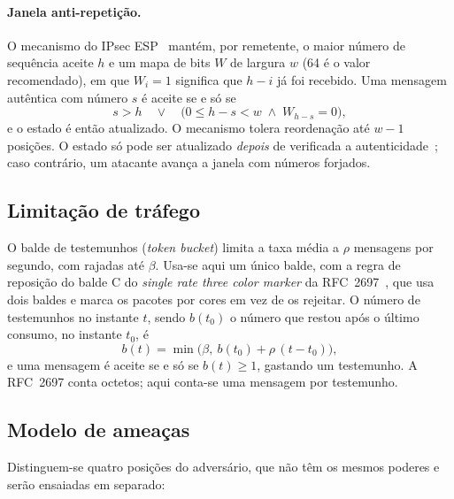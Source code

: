 \paragraph{Janela anti-repetição.} O mecanismo do IPsec ESP~\cite[§3.4.3]{rfc4303} mantém,
por remetente, o maior número de sequência aceite $h$ e um mapa de bits $W$ de
largura $w$ (64 é o valor recomendado), em que $W_i = 1$ significa que $h - i$ já
foi recebido. Uma mensagem autêntica com número $s$ é aceite se e só se
\begin{equation}
  s > h \quad\vee\quad \big(0 \le h - s < w \;\wedge\; W_{h-s} = 0\big),
  \label{eq:janela}
\end{equation}
e o estado é então atualizado. O mecanismo tolera reordenação até $w-1$ posições. O
estado só pode ser atualizado \emph{depois} de verificada a
autenticidade~\cite[§3.4.3]{rfc4303}; caso contrário, um atacante avança a janela com números forjados.

\subsection{Limitação de tráfego}
\label{sec:token-bucket}

O balde de testemunhos (\emph{token bucket}) limita a taxa média a $\rho$ mensagens
por segundo, com rajadas até $\beta$. Usa-se aqui um único balde, com a regra de
reposição do balde C do \emph{single rate three color marker} da
RFC~2697~\cite[§3]{rfc2697}, que usa dois baldes e marca os pacotes por cores em vez
de os rejeitar. O número de testemunhos no instante $t$, sendo $b(t_0)$ o
número que restou após o último consumo, no instante $t_0$, é
\begin{equation}
  b(t) = \min\!\big(\beta,\ b(t_0) + \rho\,(t - t_0)\big),
  \label{eq:token-bucket}
\end{equation}
e uma mensagem é aceite se e só se $b(t) \ge 1$, gastando um testemunho. A RFC~2697 conta
octetos; aqui conta-se uma mensagem por testemunho.

\subsection{Modelo de ameaças}
\label{sec:ameacas}

Distinguem-se quatro posições do adversário, que não têm os mesmos poderes e
serão ensaiadas em separado:

